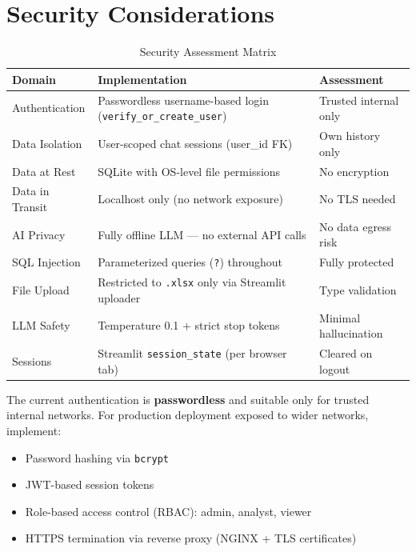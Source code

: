 \documentclass[12pt, a4paper, twoside]{article}
\begin{document}
\newpage

\section{Security Considerations}

\begin{table}[H]
\centering
\caption{Security Assessment Matrix}
\label{tab:security}
\begin{tabularx}{\textwidth}{L{2.2cm} X L{3cm}}
\toprule
{}\color{white}\textbf{Domain} & \color{white}\textbf{Implementation} & \color{white}\textbf{Assessment} \\
\midrule
Authentication & Passwordless username-based login (\texttt{verify\_or\_create\_user}) & Trusted internal only \\
Data Isolation & User-scoped chat sessions (user\_id FK) & Own history only \\
Data at Rest & SQLite with OS-level file permissions & No encryption \\
Data in Transit & Localhost only (no network exposure) & No TLS needed \\
AI Privacy & Fully offline LLM — no external API calls & No data egress risk \\
SQL Injection & Parameterized queries (\texttt{?}) throughout & Fully protected \\
File Upload & Restricted to \texttt{.xlsx} only via Streamlit uploader & Type validation \\
LLM Safety & Temperature 0.1 + strict stop tokens & Minimal hallucination \\
Sessions & Streamlit \texttt{session\_state} (per browser tab) & Cleared on logout \\
\bottomrule
\end{tabularx}
\end{table}

\begin{warnbox}
The current authentication is \textbf{passwordless} and suitable only for trusted internal networks. For production deployment exposed to wider networks, implement:
\begin{itemize}[itemsep=2pt]
  \item Password hashing via \texttt{bcrypt}
  \item JWT-based session tokens
  \item Role-based access control (RBAC): admin, analyst, viewer
  \item HTTPS termination via reverse proxy (NGINX + TLS certificates)
\end{itemize}
\end{warnbox}
\end{document}
